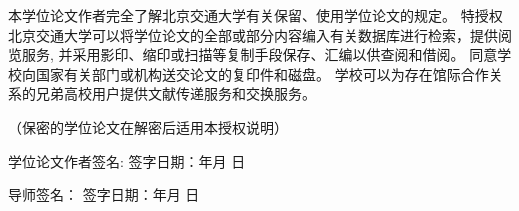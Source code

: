 {\xiaosi[1.3]
本学位论文作者完全了解北京交通大学有关保留、使用学位论文的规定。
特授权北京交通大学可以将学位论文的全部或部分内容编入有关数据库进行检索，提供阅览服务,
并采用影印、缩印或扫描等复制手段保存、汇编以供查阅和借阅。
同意学校向国家有关部门或机构送交论文的复印件和磁盘。
学校可以为存在馆际合作关系的兄弟高校用户提供文献传递服务和交换服务。

（保密的学位论文在解密后适用本授权说明）
\vskip 3.5cm
\begin{minipage}[t]{\textwidth}
\begin{minipage}[t]{0.45\textwidth}
学位论文作者签名:
\vskip 0.8cm
签字日期：\hspace{1cm}年\hspace{0.5cm}月\hspace{0.5cm} 日
\end{minipage}\hfill
\begin{minipage}[t]{0.45\textwidth}
导师签名：
\vskip 0.8cm
签字日期：\hspace{1cm}年\hspace{0.5cm}月\hspace{0.5cm} 日
\end{minipage}
\end{minipage}
}




